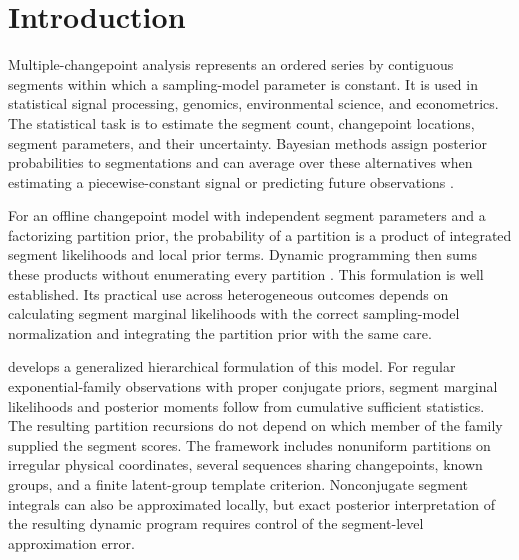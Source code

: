 \section{Introduction}
\label{sec:introduction}

Multiple-changepoint analysis represents an ordered series by contiguous segments
within which a sampling-model parameter is constant. It is used in statistical
signal processing, genomics, environmental science, and econometrics. The
statistical task is to estimate the segment count, changepoint locations,
segment parameters, and their uncertainty. Bayesian methods assign posterior
probabilities to segmentations and can average over these alternatives when
estimating a piecewise-constant signal or predicting future observations
\citep{barry1992ppm,barry1993bayesCP,fearnhead2006exact,hutter2006bpcr}.

For an offline changepoint model with independent segment parameters and a
factorizing partition prior, the probability of a partition is a product of
integrated segment likelihoods and local prior terms. Dynamic programming
then sums these products without enumerating every partition
\citep{barry1992ppm,fearnhead2006exact,hutter2006bpcr}. This formulation is
well established. Its practical use across heterogeneous outcomes depends on
calculating segment marginal likelihoods with the correct sampling-model
normalization and integrating the partition prior with the same care.

\BayesBreak develops a generalized hierarchical formulation of this model.
For regular exponential-family observations with proper conjugate priors,
segment marginal likelihoods and posterior moments follow from cumulative
sufficient statistics. The resulting partition recursions do not depend on
which member of the family supplied the segment scores. The framework includes
nonuniform partitions on irregular physical coordinates, several sequences
sharing changepoints, known groups, and a finite latent-group template
criterion. Nonconjugate segment integrals can also be approximated locally,
but exact posterior interpretation of the resulting dynamic program requires
control of the segment-level approximation error.

